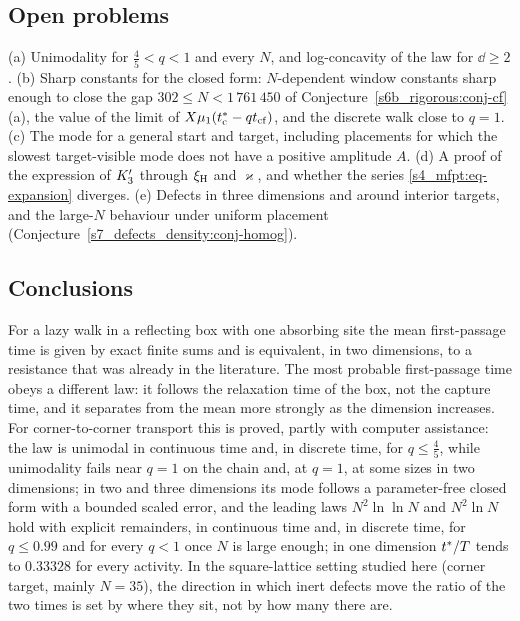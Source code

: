 \subsection{Open problems}\label{s9_discussion:ssec-open}

(a) Unimodality for $\frac45<q<1$ and every $N$, and log-concavity of the law for $\dd\ge2$. (b) Sharp constants for the
closed form: $N$-dependent window constants sharp enough to close the gap $302\le N<1\,761\,450$ of
Conjecture~\ref{s6b_rigorous:conj-cf}(a), the value of the limit of $X\mu_{1}(t^{*}_{\mathrm{c}}-qt_{\mathrm{cf}})$, and the discrete walk close
to $q=1$. (c) The mode for a general start and target, including placements for
which the slowest target-visible mode does not have a positive amplitude $A$. (d) A proof of the expression of $K_{3}'$
through $\xi_{\mathrm{H}}$ and $\varkappa$, and whether the series \eqref{s4_mfpt:eq-expansion} diverges. (e) Defects in three
dimensions and around interior targets, and the large-$N$ behaviour under uniform placement
(Conjecture~\ref{s7_defects_density:conj-homog}).

\subsection{Conclusions}\label{s9_discussion:ssec-conclusions}

For a lazy walk in a reflecting box with one absorbing site the mean first-passage time is given by exact finite sums
and is equivalent, in two dimensions, to a resistance that was already in the literature. The most probable
first-passage time obeys a different law: it follows the relaxation time of the box, not the capture time, and it
separates from the mean more strongly as the dimension increases. For corner-to-corner transport this is proved, partly
with computer assistance: the law is unimodal in continuous time and, in discrete time, for $q\le\frac45$, while
unimodality fails near $q=1$ on the chain and, at $q=1$, at some sizes in two dimensions; in two and three dimensions
its mode follows a parameter-free closed form with a bounded scaled error, and the leading laws $N^{2}\ln\ln N$ and
$N^{2}\ln N$ hold with explicit remainders, in continuous time and, in discrete time, for $q\le0.99$ and for every $q<1$ once $N$ is large enough; in one dimension $t^{*}/T$ tends to $0.33328$ for every activity.
In the square-lattice setting studied here (corner target, mainly $N=35$), the direction
in which inert defects move the ratio of the two times is set by where they sit, not by how many there are.
